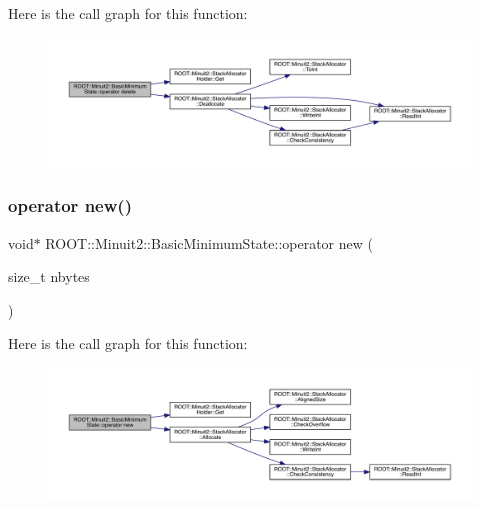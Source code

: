 Here is the call graph for this function\+:
\nopagebreak
\begin{figure}[H]
\begin{center}
\leavevmode
\includegraphics[width=350pt]{d0/db1/classROOT_1_1Minuit2_1_1BasicMinimumState_a19ccca7f7825c16fca3c7ab6f147fdd6_cgraph}
\end{center}
\end{figure}
\mbox{\label{classROOT_1_1Minuit2_1_1BasicMinimumState_ad0e5ab496757c5bee3544485a49fe7aa}} 
\subsubsection{\texorpdfstring{operator new()}{operator new()}\hspace{0.1cm}{\footnotesize\ttfamily [1/3]}}
{\footnotesize\ttfamily void$\ast$ R\+O\+O\+T\+::\+Minuit2\+::\+Basic\+Minimum\+State\+::operator new (\begin{DoxyParamCaption}\item[{size\+\_\+t}]{nbytes }\end{DoxyParamCaption})\hspace{0.3cm}{\ttfamily [inline]}}

Here is the call graph for this function\+:
\nopagebreak
\begin{figure}[H]
\begin{center}
\leavevmode
\includegraphics[width=350pt]{d0/db1/classROOT_1_1Minuit2_1_1BasicMinimumState_ad0e5ab496757c5bee3544485a49fe7aa_cgraph}
\end{center}
\end{figure}
\mbox{\label{classROOT_1_1Minuit2_1_1BasicMinimumState_ad0e5ab496757c5bee3544485a49fe7aa}} 
